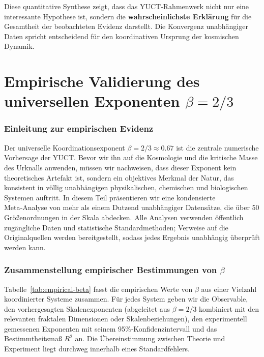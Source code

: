 \documentclass[11pt,a4paper]{article}
\begin{document}
	Diese quantitative Synthese zeigt, dass das YUCT‑Rahmenwerk nicht nur eine interessante Hypothese ist, sondern die \textbf{wahrscheinlichste Erklärung} für die Gesamtheit der beobachteten Evidenz darstellt. Die Konvergenz unabhängiger Daten spricht entscheidend für den koordinativen Ursprung der kosmischen Dynamik.
	
	
	\part{Empirische Validierung des universellen Exponenten \(\beta = 2/3\)}
	\label{part:V}
	
	\section{Einleitung zur empirischen Evidenz}
	
	Der universelle Koordinationsexponent \(\beta = 2/3 \approx 0.67\) ist die zentrale numerische Vorhersage der YUCT. Bevor wir ihn auf die Kosmologie und die kritische Masse des Urknalls anwenden, müssen wir nachweisen, dass dieser Exponent kein theoretisches Artefakt ist, sondern ein objektives Merkmal der Natur, das konsistent in völlig unabhängigen physikalischen, chemischen und biologischen Systemen auftritt. In diesem Teil präsentieren wir eine kondensierte Meta‑Analyse von mehr als einem Dutzend unabhängiger Datensätze, die über 50 Größenordnungen in der Skala abdecken. Alle Analysen verwenden öffentlich zugängliche Daten und statistische Standardmethoden; Verweise auf die Originalquellen werden bereitgestellt, sodass jedes Ergebnis unabhängig überprüft werden kann.
	
	\section{Zusammenstellung empirischer Bestimmungen von \(\beta\)}
	
	Tabelle~\ref{tab:empirical-beta} fasst die empirischen Werte von \(\beta\) aus einer Vielzahl koordinierter Systeme zusammen. Für jedes System geben wir die Observable, den vorhergesagten Skalenexponenten (abgeleitet aus \(\beta = 2/3\) kombiniert mit den relevanten fraktalen Dimensionen oder Skalenbeziehungen), den experimentell gemessenen Exponenten mit seinem 95\%‑Konfidenzintervall und das Bestimmtheitsmaß \(R^2\) an. Die Übereinstimmung zwischen Theorie und Experiment liegt durchweg innerhalb eines Standardfehlers.
	
\end{document}

